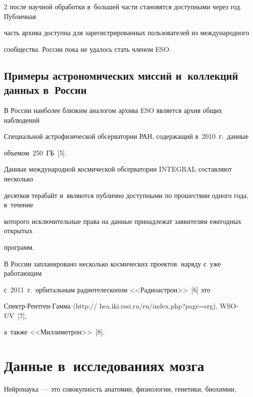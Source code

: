 \begin{multicols}{2}
\mbox{после} научной обработки в~большей части становятся доступными через год. Публичная 


часть архива доступна для зарегистрированных пользователей из международного 


сообщества. России пока не удалось стать членом ESO.





\subsection{Примеры астрономических миссий и~коллекций данных в~России}





  В России наиболее близким аналогом архива ESO является архив общих наблюдений 


Специальной астрофизической обсерватории РАН, содержащий в~2010~г.\ данные 


объемом~250~ГБ~[5].


  


  Данные международной космической обсерватории INTEGRAL составляют несколько 


десятков терабайт и~являются публично доступными по про\-шест\-вии одного года, в~течение 


которого исключительные права на данные принадлежат заявителям ежегодных открытых 


программ. 


  


  В России запланировано несколько космических проектов: наряду с~уже работающим 


с~2011~г.\ орбитальным радиотелескопом <<Радиоастрон>>~[6] это  


Спектр-Рент\-ген-Гам\-ма ({\sf http:// hea.iki.rssi.ru/ru/index.php?page=srg}), WSO-UV~[7], 


а~также <<Миллиметрон>>~[8].





\section{Данные в~исследованиях мозга}





  Нейронаука~--- это совокупность анатомии, физиологии, генетики, биохимии, 



\end{multicols}

